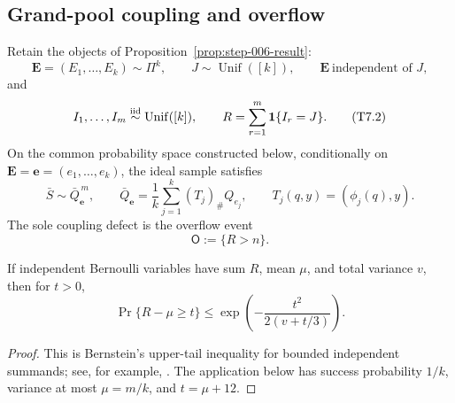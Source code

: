 \subsection{Grand-pool coupling and overflow}
\label{app:step-007}

Retain the objects of Proposition~\ref{prop:step-006-result}:
\[
\mathbf E=(E_1,\ldots,E_k)\sim\Pi^k,\qquad
J\sim\operatorname{Unif}([k]),\qquad
\mathbf E\ \text{independent of }J,
\tag{T7.1}\label{eq:step-007-t7-1}
\]
and
\[
I_1,\ldots,I_m\stackrel{\rm iid}{\sim}\operatorname{Unif}([k]),
\qquad R=\sum_{r=1}^m\mathbf1\{I_r=J\}.
\tag{T7.2}\label{eq:step-007-t7-2}
\]
On the common probability space constructed below, conditionally on
$\mathbf E=\mathbf e=(e_1,\ldots,e_k)$, the ideal sample satisfies
\[
\bar S\sim\bar Q_{\mathbf e}^{\,m},
\qquad
\bar Q_{\mathbf e}=\frac1k\sum_{j=1}^k(T_j)_\#Q_{e_j},
\qquad T_j(q,y)=(\phi_j(q),y).
\tag{T7.3}\label{eq:step-007-t7-3}
\]
The sole coupling defect is the overflow event
\[
\mathsf O:=\{R>n\}.
\tag{T7.4}\label{eq:step-007-t7-4}
\]

\begin{lemma}
\label{lem:bernstein-occupancy}
If independent Bernoulli variables have sum $R$, mean $\mu$, and total
variance $v$, then for $t>0$,
\[
\Pr\{R-\mu\geq t\}
\leq\exp\left(-\frac{t^2}{2(v+t/3)}\right).
\tag{C7.1}\label{eq:step-007-c7-1}
\]
\end{lemma}
\begin{proof}
This is Bernstein's upper-tail inequality for bounded independent
summands; see, for example, \citet{boucheronLugosiMassart2013}.  The
application below has success probability $1/k$, variance at most
$\mu=m/k$, and $t=\mu+12$.
\end{proof}



